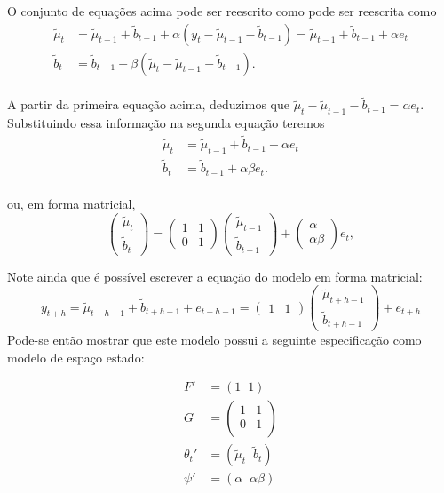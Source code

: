 \documentclass[
  letterpaper,
  DIV=11,
  numbers=noendperiod]{scrartcl}
\theoremstyle{plain}
\theoremstyle{plain}
\theoremstyle{definition}
\theoremstyle{definition}
\theoremstyle{remark}
\begin{document}
O conjunto de equações acima pode ser reescrito como pode ser reescrita
como \[\begin{align*}
    \tilde{\mu}_t &= \tilde{\mu}_{t-1} + \tilde{b}_{t-1}+\alpha\left( y_t-\tilde{\mu}_{t-1} - \tilde{b}_{t-1}\right)= \tilde{\mu}_{t-1} + \tilde{b}_{t-1}+\alpha e_t\\
    \tilde{b}_t &= \tilde{b}_{t-1}+\beta (\tilde{\mu}_t - \tilde{\mu}_{t-1}-\tilde{b}_{t-1}).
    \end{align*}\]\\
A partir da primeira equação acima, deduzimos que
\(\tilde{\mu}_t-\tilde{\mu}_{t-1}-\tilde{b}_{t-1}=\alpha e_t\).
Substituindo essa informação na segunda equação teremos \[\begin{align*}
    \tilde{\mu}_t &= \tilde{\mu}_{t-1} + \tilde{b}_{t-1}+\alpha e_t\\
    \tilde{b}_t &= \tilde{b}_{t-1}+\alpha\beta e_t.
    \end{align*}\]\\
ou, em forma matricial,
\[\left(\begin{array}{c}\tilde{\mu}_t\\ \tilde{b}_t\end{array}\right)=\left(\begin{array}{cc}1 & 1 \\ 0 & 1\end{array}\right)\left(\begin{array}{c}\tilde{\mu}_{t-1}\\ \tilde{b}_{t-1}\end{array}\right)+\left(\begin{array}{c}\alpha\\ \alpha\beta\end{array}\right)e_t,\]

Note ainda que é possível escrever a equação do modelo em forma
matricial:
\[y_{t+h}=\tilde{\mu}_{t+h-1}+\tilde{b}_{t+h-1}+e_{t+h-1}=(\begin{array}{cc}1&1\end{array})\left(\begin{array}{c}\tilde{\mu}_{t+h-1}\\ \tilde{b}_{t+h-1}\end{array}\right)+e_{t+h}\]
Pode-se então mostrar que este modelo possui a seguinte especificação
como modelo de espaço estado:

\[\begin{align}
F'&=(1\;\; 1)\\
G&=\left(\begin{array}{cc} 1 & 1 \\ 0 & 1\\ \end{array}\right)\\
\theta_t'&=(\tilde{\mu}_t\;\;\tilde{b}_t)\\
\psi'&=(\alpha\;\;\alpha\beta)
\end{align}\]
\end{document}
